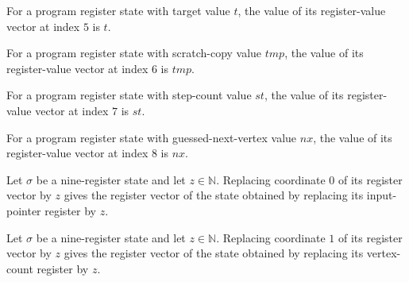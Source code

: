 \begin{lemma}
\label{Complexity.LogProg.PReg.v_5}
\leanok
{}
For a program register state with target value $t$, the value of its register-value
vector at index $5$ is $t$.
\end{lemma}

\begin{lemma}
\label{Complexity.LogProg.PReg.v_6}
\leanok
{}
For a program register state with scratch-copy value $tmp$, the value of its
register-value vector at index $6$ is $tmp$.
\end{lemma}

\begin{lemma}
\label{Complexity.LogProg.PReg.v_7}
\leanok
{}
For a program register state with step-count value $st$, the value of its register-value
vector at index $7$ is $st$.
\end{lemma}

\begin{lemma}
\label{Complexity.LogProg.PReg.v_8}
\leanok
{}
For a program register state with guessed-next-vertex value $nx$, the value of its
register-value vector at index $8$ is $nx$.
\end{lemma}

\begin{lemma}
\label{Complexity.LogProg.PReg.u_0}
\leanok
{}
Let $\sigma$ be a nine-register state and let $z\in\mathbb{N}$. Replacing coordinate $0$
of its register vector by $z$ gives the register vector of the state obtained by
replacing its input-pointer register by $z$.
\end{lemma}

\begin{lemma}
\label{Complexity.LogProg.PReg.u_1}
\leanok
{}
Let $\sigma$ be a nine-register state and let $z\in\mathbb{N}$. Replacing coordinate $1$
of its register vector by $z$ gives the register vector of the state obtained by
replacing its vertex-count register by $z$.
\end{lemma}

